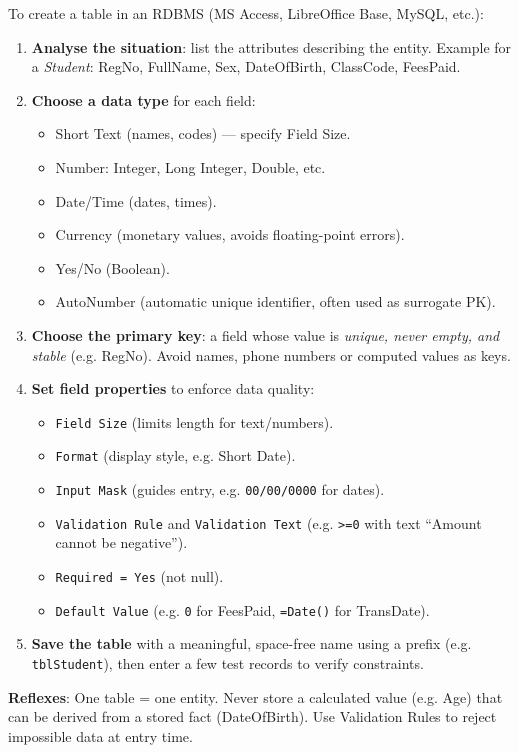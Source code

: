 \documentclass[11pt]{article}
\begin{document}
\begin{methode}
To create a table in an RDBMS (MS Access, LibreOffice Base, MySQL, etc.):
\begin{enumerate}
\item \textbf{Analyse the situation}: list the attributes describing the entity. Example for a \emph{Student}: RegNo, FullName, Sex, DateOfBirth, ClassCode, FeesPaid.
\item \textbf{Choose a data type} for each field:
\begin{itemize}
\item Short Text (names, codes) --- specify Field Size.
\item Number: Integer, Long Integer, Double, etc.
\item Date/Time (dates, times).
\item Currency (monetary values, avoids floating-point errors).
\item Yes/No (Boolean).
\item AutoNumber (automatic unique identifier, often used as surrogate PK).
\end{itemize}
\item \textbf{Choose the primary key}: a field whose value is \emph{unique, never empty, and stable} (e.g. RegNo). Avoid names, phone numbers or computed values as keys.
\item \textbf{Set field properties} to enforce data quality:
\begin{itemize}
\item \texttt{Field Size} (limits length for text/numbers).
\item \texttt{Format} (display style, e.g. Short Date).
\item \texttt{Input Mask} (guides entry, e.g. \texttt{00/00/0000} for dates).
\item \texttt{Validation Rule} and \texttt{Validation Text} (e.g. \texttt{>=0} with text ``Amount cannot be negative'').
\item \texttt{Required = Yes} (not null).
\item \texttt{Default Value} (e.g. \texttt{0} for FeesPaid, \texttt{=Date()} for TransDate).
\end{itemize}
\item \textbf{Save the table} with a meaningful, space-free name using a prefix (e.g. \texttt{tblStudent}), then enter a few test records to verify constraints.
\end{enumerate}
\textbf{Reflexes}: One table = one entity. Never store a calculated value (e.g. Age) that can be derived from a stored fact (DateOfBirth). Use Validation Rules to reject impossible data at entry time.
\end{methode}
\end{document}
